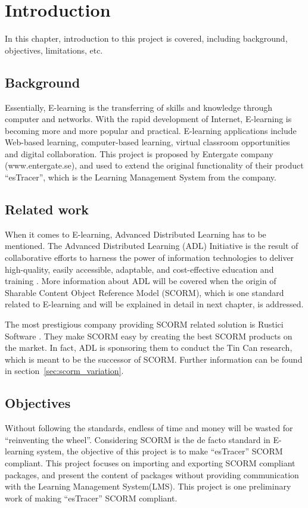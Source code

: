 \chapter{Introduction}
\thispagestyle{empty}
In this chapter, introduction to this project is covered, including background, objectives, limitations, etc.
\section{Background}
Essentially, E-learning is the transferring of skills and knowledge through computer and networks. With the rapid development of Internet, E-learning 
is becoming more and more popular and practical. E-learning applications include Web-based learning, computer-based learning, virtual classroom 
opportunities and digital collaboration. This project is proposed by Entergate company (www.entergate.se), and used to extend the original 
functionality of their product ``esTracer'', which is the Learning Management System from the company.
\section{Related work}
When it comes to E-learning, Advanced Distributed Learning has to be mentioned. The Advanced Distributed Learning (ADL) Initiative is the result of 
collaborative efforts to harness the power of information technologies to deliver high-quality, easily accessible, adaptable, and cost-effective 
education and training \cite{adl_intro}. More information about ADL will be covered when the origin of Sharable Content Object Reference Model 
(SCORM), which is one standard related to E-learning and will be explained in detail in next chapter, is addressed.

The most prestigious company providing SCORM related solution is Rustici Software \cite{rustici_software}. They make SCORM easy by creating the best 
SCORM products on the market. In fact, ADL is sponsoring them to conduct the Tin Can research, which is meant to be the successor of SCORM. Further 
information can be found in section~\ref{sec:scorm_variation}.
\section{Objectives}
Without following the standards, endless of time and money will be wasted for ``reinventing the wheel''. Considering SCORM is the de facto standard 
in E-learning system, the objective of this project is to make ``esTracer'' SCORM compliant. This project focuses on importing and exporting SCORM 
compliant packages, and present the content of packages without providing communication with the Learning Management System(LMS). This project is one 
preliminary work of making ``esTracer'' SCORM compliant.

